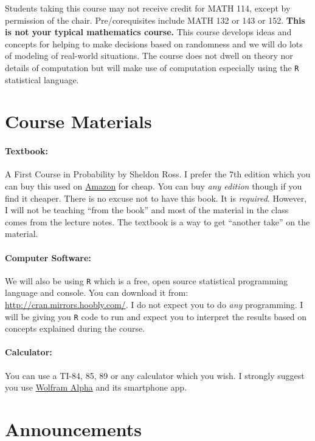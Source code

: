 \documentclass[12pt]{article}
\newcommand{\qu}[1]{``#1''}
\begin{document}
Students taking this course may not receive credit for MATH 114, except by permission of the chair. Pre/corequisites include MATH 132 or 143 or 152. \textbf{This is not your typical mathematics course.} This course develops ideas and concepts for helping to make decisions based on randomness and we will do lots of modeling of real-world situations. The course does not dwell on theory nor details of computation but will make use of computation especially using the \texttt{R} statistical language.


\section*{Course Materials}

\paragraph{Textbook:} A First Course in Probability by Sheldon Ross. I prefer the 7th edition which you can buy this used on \href{http://www.amazon.com/First-Course-Probability-7th-Edition/dp/0131856626}{Amazon} for cheap. You can buy \textit{any edition} though if you find it cheaper. There is no excuse not to have this book. It is \textit{required}. However, I will not be teaching \qu{from the book} and most of the material in the class comes from the lecture notes. The textbook is a way to get ``another take'' on the material.

\paragraph{Computer Software:} We will also be using \texttt{R} which is a free, open source statistical programming language and console. You can download it from: \url{http://cran.mirrors.hoobly.com/}. I do not expect you to do \textit{any} programming. I will be giving you \texttt{R} code to run and expect you to interpret the results based on concepts explained during the course.

\paragraph{Calculator:} You can use a TI-84, 85, 89 or any calculator which you wish. I strongly suggest you use \href{http://www.wolframalpha.com/}{Wolfram Alpha} and its smartphone app.

\section*{Announcements}
\end{document}
